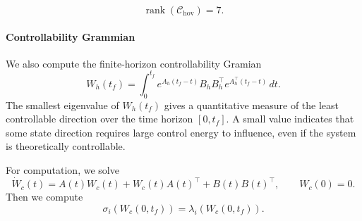\[
    \operatorname{rank}(\mathcal C_{\mathrm{hov}})=7.
\]
\paragraph{Controllability Grammian}
We also compute the finite-horizon controllability Gramian
\[
    W_h(t_f)
    =
    \int_0^{t_f} e^{A_h(t_f-t)} B_h B_h^\top e^{A_h^\top(t_f-t)}\,dt.
\]
The smallest eigenvalue of $W_h(t_f)$ gives a quantitative measure of the least controllable direction over the time horizon $[0,t_f]$. A small value indicates that some state direction requires large control energy to influence, even if the system is theoretically controllable.

For computation, we solve
\[
    \boxed{\dot W_c(t)=A(t)W_c(t)+W_c(t)A(t)^{\top}+B(t)B(t)^{\top},\qquad W_c(0)=0.}
\]
Then we compute
\[
    \boxed{\sigma_i(W_c(0,t_f))=\lambda_i(W_c(0,t_f))}.
\]

